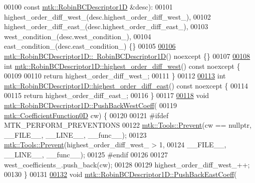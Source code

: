 \begin{DoxyCode}
00100     \textcolor{keyword}{const} \hyperlink{classmtk_1_1RobinBCDescriptor1D}{mtk::RobinBCDescriptor1D} &desc):
00101   highest\_order\_diff\_west\_(desc.highest\_order\_diff\_west\_),
00102   highest\_order\_diff\_east\_(desc.highest\_order\_diff\_east\_),
00103   west\_condition\_(desc.west\_condition\_),
00104   east\_condition\_(desc.east\_condition\_) \{\}
00105 
\hypertarget{mtk__robin__bc__descriptor__1d_8cc_source_l00106}{}\hyperlink{classmtk_1_1RobinBCDescriptor1D_a247cdbba1ae673d576b71829f2b82736}{00106} \hyperlink{classmtk_1_1RobinBCDescriptor1D_a247cdbba1ae673d576b71829f2b82736}{mtk::RobinBCDescriptor1D::~RobinBCDescriptor1D}() noexcept \{\}
00107 
\hypertarget{mtk__robin__bc__descriptor__1d_8cc_source_l00108}{}\hyperlink{classmtk_1_1RobinBCDescriptor1D_a1935b9e2e560ea5f176ac6e0a3823d50}{00108} \textcolor{keywordtype}{int} \hyperlink{classmtk_1_1RobinBCDescriptor1D_a1935b9e2e560ea5f176ac6e0a3823d50}{mtk::RobinBCDescriptor1D::highest\_order\_diff\_west}() 
      const noexcept \{
00109 
00110   \textcolor{keywordflow}{return} highest\_order\_diff\_west\_;
00111 \}
00112 
\hypertarget{mtk__robin__bc__descriptor__1d_8cc_source_l00113}{}\hyperlink{classmtk_1_1RobinBCDescriptor1D_a2e7419a5cd02721104bf9c1e52b6fb61}{00113} \textcolor{keywordtype}{int} \hyperlink{classmtk_1_1RobinBCDescriptor1D_a2e7419a5cd02721104bf9c1e52b6fb61}{mtk::RobinBCDescriptor1D::highest\_order\_diff\_east}() 
      const noexcept \{
00114 
00115   \textcolor{keywordflow}{return} highest\_order\_diff\_east\_;
00116 \}
00117 
\hypertarget{mtk__robin__bc__descriptor__1d_8cc_source_l00118}{}\hyperlink{classmtk_1_1RobinBCDescriptor1D_acdf8a75f8c39b3b8a032af81e0fd2e89}{00118} \textcolor{keywordtype}{void} \hyperlink{classmtk_1_1RobinBCDescriptor1D_acdf8a75f8c39b3b8a032af81e0fd2e89}{mtk::RobinBCDescriptor1D::PushBackWestCoeff}(
00119     \hyperlink{group__c07-mim__ops_ga04276745b4d511f0f3c636d6e0df7c2d}{mtk::CoefficientFunction0D} cw) \{
00120 
00121 \textcolor{preprocessor}{  #ifdef MTK\_PERFORM\_PREVENTIONS}
00122   \hyperlink{classmtk_1_1Tools_a332324c6f25e66be9dff48c5987a3b9f}{mtk::Tools::Prevent}(cw == \textcolor{keyword}{nullptr}, \_\_FILE\_\_, \_\_LINE\_\_, \_\_func\_\_);
00123   \hyperlink{classmtk_1_1Tools_a332324c6f25e66be9dff48c5987a3b9f}{mtk::Tools::Prevent}(highest\_order\_diff\_west\_ > 1,
00124                       \_\_FILE\_\_, \_\_LINE\_\_, \_\_func\_\_);
00125 \textcolor{preprocessor}{  #endif}
00126 
00127   west\_coefficients\_.push\_back(cw);
00128 
00129   highest\_order\_diff\_west\_++;
00130 \}
00131 
\hypertarget{mtk__robin__bc__descriptor__1d_8cc_source_l00132}{}\hyperlink{classmtk_1_1RobinBCDescriptor1D_a7791c11e0950656cb5608a77918c28d4}{00132} \textcolor{keywordtype}{void} \hyperlink{classmtk_1_1RobinBCDescriptor1D_a7791c11e0950656cb5608a77918c28d4}{mtk::RobinBCDescriptor1D::PushBackEastCoeff}(

\end{DoxyCode}
